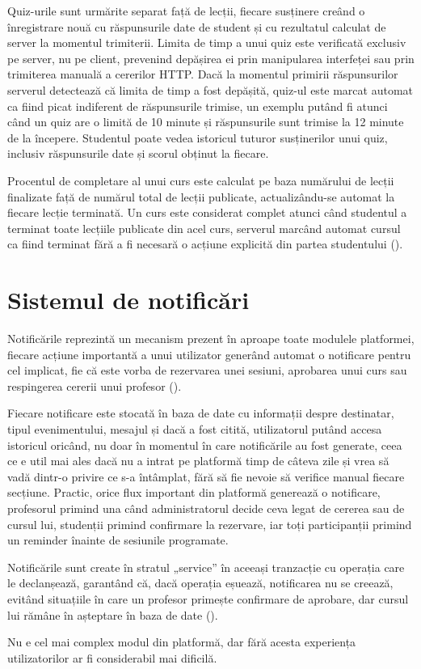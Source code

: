 Quiz-urile sunt urmărite separat față de lecții, fiecare susținere creând o înregistrare nouă cu răspunsurile date de student și cu rezultatul calculat de server la momentul trimiterii. Limita de timp a unui quiz este verificată exclusiv pe server, nu pe client, prevenind depășirea ei prin manipularea interfeței sau prin trimiterea manuală a cererilor HTTP. Dacă la momentul primirii răspunsurilor serverul detectează că limita de timp a fost depășită, quiz-ul este marcat automat ca fiind picat indiferent de răspunsurile trimise, un exemplu putând fi atunci când un quiz are o limită de 10 minute și răspunsurile sunt trimise la 12 minute de la începere. Studentul poate vedea istoricul tuturor susținerilor unui quiz, inclusiv răspunsurile date și scorul obținut la fiecare.

Procentul de completare al unui curs este calculat pe baza numărului de lecții finalizate față de numărul total de lecții publicate, actualizându-se automat la fiecare lecție terminată. Un curs este considerat complet atunci când studentul a terminat toate lecțiile publicate din acel curs, serverul marcând automat cursul ca fiind terminat fără a fi necesară o acțiune explicită din partea studentului ().

\section{Sistemul de notificări}
Notificările reprezintă un mecanism prezent în aproape toate modulele platformei, fiecare acțiune importantă a unui utilizator generând automat o notificare pentru cel implicat, fie că este vorba de rezervarea unei sesiuni, aprobarea unui curs sau respingerea cererii unui profesor ().

Fiecare notificare este stocată în baza de date cu informații despre destinatar, tipul evenimentului, mesajul și dacă a fost citită, utilizatorul putând accesa istoricul oricând, nu doar în momentul în care notificările au fost generate, ceea ce e util mai ales dacă nu a intrat pe platformă timp de câteva zile și vrea să vadă dintr-o privire ce s-a întâmplat, fără să fie nevoie să verifice manual fiecare secțiune. Practic, orice flux important din platformă generează o notificare, profesorul primind una când administratorul decide ceva legat de cererea sau de cursul lui, studenții primind confirmare la rezervare, iar toți participanții primind un reminder înainte de sesiunile programate.

Notificările sunt create în stratul „service” în aceeași tranzacție cu operația care le declanșează, garantând că, dacă operația eșuează, notificarea nu se creează, evitând situațiile în care un profesor primește confirmare de aprobare, dar cursul lui rămâne în așteptare în baza de date ().

Nu e cel mai complex modul din platformă, dar fără acesta experiența utilizatorilor ar fi considerabil mai dificilă.
